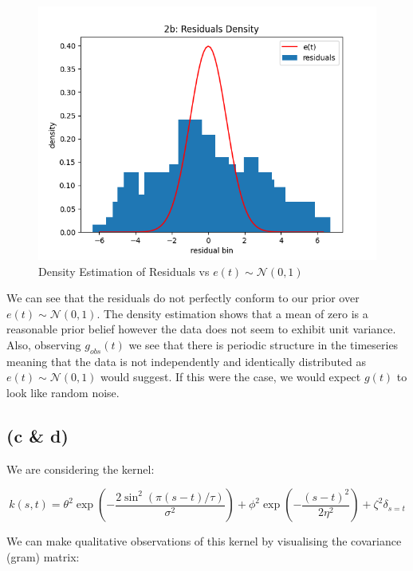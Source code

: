 \documentclass[12pt]{article}
\begin{document}
\begin{figure}[h]
\centering
\includegraphics[scale=0.5]{outputs/q2/b-residuals-density-estimation}
\caption{Density Estimation of Residuals vs $e(t) \sim \mathcal{N}(0, 1)$}
\label{fig:b-residuals-density-estimation}
\end{figure}

We can see that the residuals do not perfectly conform to our prior over $e(t) \sim \mathcal{N}(0, 1)$.
The density estimation shows that a mean of zero is a reasonable prior belief however the data does not seem to exhibit unit variance.
Also, observing $g_{obs}(t)$ we see that there is periodic structure in the timeseries meaning that the data is not independently and identically distributed as $e(t) \sim \mathcal{N}(0, 1)$ would suggest.
If this were the case, we would expect $g(t)$ to look like random noise.

\newpage
\subsection*{(c \& d)}

We are considering the kernel:

\[k(s, t) = \theta^2 \exp\left( - \frac{2\sin^2(\pi(s-t)/\tau)}{\sigma^2}\right) + \phi^2 \exp\left( - \frac{(s-t)^2}{2\eta^2}\right) + \zeta^2 \delta_{s=t}\]

We can make qualitative observations of this kernel by visualising the covariance (gram) matrix:
\end{document}
